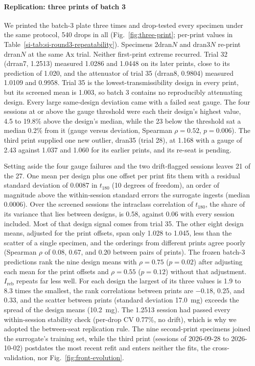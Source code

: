 \documentclass[lineno,nocopyright,upint,varvw,hyphenate]{asmejour}
\newcommand{\siref}[1]{\ref*{si-#1}}
\begin{document}
\paragraph{Replication: three prints of batch 3} We printed the batch-3
plate three times and drop-tested every specimen under the same protocol,
540 drops in all (Fig.~\ref{fig:three-print}; per-print values in
Table~\siref{tab:si-round3-repeatability}). Specimens 2dran$N$ and
dran3$N$ re-print drran$N$ at the same Ax trial. Neither first-print
extreme recurred. Trial 32 (drran7, 1.2513) measured 1.0286 and 1.0448
on its later prints, close to its prediction of 1.020, and the
attenuator of trial 35 (drran8, 0.9804) measured 1.0109 and 0.9958.
Trial 35 is the lowest-transmissibility design in every print, but its
screened mean is 1.003, so batch 3 contains no reproducibly attenuating
design. Every large same-design deviation came with a failed seat gauge.
The four sessions at or above the gauge threshold were each their design's highest
value, 4.5 to 19.8\% above the design's median, while the 23 below the
threshold sat a median 0.2\% from it (gauge versus deviation, Spearman
$\rho = 0.52$, $p = 0.006$). The third print supplied one new outlier,
dran35 (trial 28), at 1.168 with a gauge of 2.43 against 1.037 and 1.060
for its earlier prints, and its re-seat is pending.

Setting aside the four gauge failures and the two drift-flagged
sessions leaves 21 of the 27. One mean per design plus one offset per
print fits them with a residual standard deviation of 0.0087 in
$t_{180}$ (10 degrees of freedom), an order of magnitude above the
within-session standard errors the surrogate ingests (median 0.0006).
Over the screened sessions the intraclass correlation of $t_{180}$, the
share of its variance that lies between designs, is 0.58, against 0.06
with every session included. Most of that design signal comes from trial
35. The other eight design means, adjusted for the print offsets, span
only 1.028 to 1.045, less than the scatter of a single specimen, and the
orderings from different prints
agree poorly (Spearman $\rho$ of 0.08, 0.67, and 0.20 between pairs of
prints). The frozen batch-3 predictions rank the nine design means with
$\rho = 0.75$ ($p = 0.02$) after adjusting each mean for the print
offsets and $\rho = 0.55$ ($p = 0.12$) without that adjustment.
$I_{\mathrm{reb}}$ repeats far less well. For each design the largest of
its three values is 1.9 to 8.3 times the smallest, the rank correlations
between prints are $-0.18$, 0.25, and 0.33, and the scatter between
prints (standard deviation \SI{17.0}{mg}) exceeds the spread of the
design means (\SI{10.2}{mg}). The 1.2513 session had passed every
within-session stability check (per-drop CV 0.77\%, no drift), which is
why we adopted the between-seat replication rule. The nine second-print
specimens joined the surrogate's training set, while the third print
(sessions of 2026-09-28 to 2026-10-02) postdates the most recent refit
and enters neither the fits, the cross-validation, nor
Fig.~\ref{fig:front-evolution}.
\end{document}
